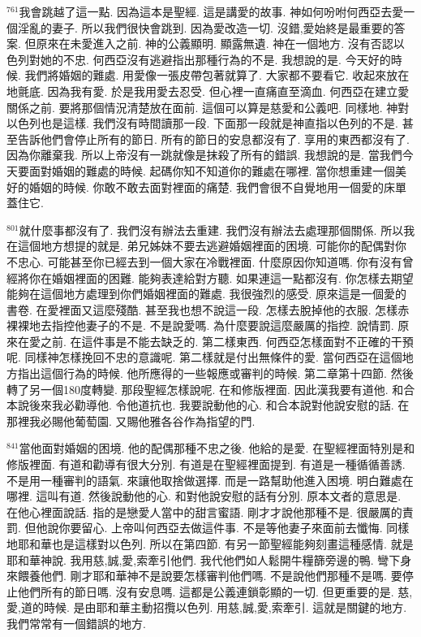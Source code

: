 \documentclass{book}
\begin{document}
$^{761}$我會跳越了這一點.
因為這本是聖經.
這是講愛的故事.
神如何吩咐何西亞去愛一個淫亂的妻子.
所以我們很快會跳到.
因為愛改造一切.
沒錯,愛始終是最重要的答案.
但原來在未愛進入之前.
神的公義顯明.
顯露無遺.
神在一個地方.
沒有否認以色列對她的不忠.
何西亞沒有逃避指出那種行為的不是.
我想說的是.
今天好的時候.
我們將婚姻的難處.
用愛像一張皮帶包著就算了.
大家都不要看它.
收起來放在地氈底.
因為我有愛.
於是我用愛去忍受.
但心裡一直痛直至滴血.
何西亞在建立愛關係之前.
要將那個情況清楚放在面前.
這個可以算是慈愛和公義吧.
同樣地.
神對以色列也是這樣.
我們沒有時間讀那一段.
下面那一段就是神直指以色列的不是.
甚至告訴他們會停止所有的節日.
所有的節日的安息都沒有了.
享用的東西都沒有了.
因為你離棄我.
所以上帝沒有一跳就像是抹殺了所有的錯誤.
我想說的是.
當我們今天要面對婚姻的難處的時候.
起碼你知不知道你的難處在哪裡.
當你想重建一個美好的婚姻的時候.
你敢不敢去面對裡面的痛楚.
我們會很不自覺地用一個愛的床單蓋住它.

$^{801}$就什麼事都沒有了.
我們沒有辦法去重建.
我們沒有辦法去處理那個關係.
所以我在這個地方想提的就是.
弟兄姊妹不要去逃避婚姻裡面的困境.
可能你的配偶對你不忠心.
可能甚至你已經去到一個大家在冷戰裡面.
什麼原因你知道嗎.
你有沒有曾經將你在婚姻裡面的困難.
能夠表達給對方聽.
如果連這一點都沒有.
你怎樣去期望能夠在這個地方處理到你們婚姻裡面的難處.
我很強烈的感受.
原來這是一個愛的書卷.
在愛裡面又這麼殘酷.
甚至我也想不說這一段.
怎樣去脫掉他的衣服.
怎樣赤裸裸地去指控他妻子的不是.
不是說愛嗎.
為什麼要說這麼嚴厲的指控.
說情罰.
原來在愛之前.
在這件事是不能去缺乏的.
第二樣東西.
何西亞怎樣面對不正確的干預呢.
同樣神怎樣挽回不忠的意識呢.
第二樣就是付出無條件的愛.
當何西亞在這個地方指出這個行為的時候.
他所應得的一些報應或審判的時候.
第二章第十四節.
然後轉了另一個180度轉變.
那段聖經怎樣說呢.
在和修版裡面.
因此漢我要有道他.
和合本說後來我必勸導他.
令他道抗也.
我要說動他的心.
和合本說對他說安慰的話.
在那裡我必賜他葡萄園.
又賜他雅各谷作為指望的門.

$^{841}$當他面對婚姻的困境.
他的配偶那種不忠之後.
他給的是愛.
在聖經裡面特別是和修版裡面.
有道和勸導有很大分別.
有道是在聖經裡面提到.
有道是一種循循善誘.
不是用一種審判的語氣.
來讓他取捨做選擇.
而是一路幫助他進入困境.
明白難處在哪裡.
這叫有道.
然後說動他的心.
和對他說安慰的話有分別.
原本文者的意思是.
在他心裡面說話.
指的是戀愛人當中的甜言蜜語.
剛才才說他那種不是.
很嚴厲的責罰.
但他說你要留心.
上帝叫何西亞去做這件事.
不是等他妻子來面前去懺悔.
同樣地耶和華也是這樣對以色列.
所以在第四節.
有另一節聖經能夠刻畫這種感情.
就是耶和華神說.
我用慈,誠,愛,索牽引他們.
我代他們如人鬆開牛糧篩旁邊的鴨.
彎下身來餵養他們.
剛才耶和華神不是說要怎樣審判他們嗎.
不是說他們那種不是嗎.
要停止他們所有的節日嗎.
沒有安息嗎.
這都是公義連鎖彰顯的一切.
但更重要的是.
慈,愛,道的時候.
是由耶和華主動招攬以色列.
用慈,誠,愛,索牽引.
這就是關鍵的地方.
我們常常有一個錯誤的地方.
\end{document}

